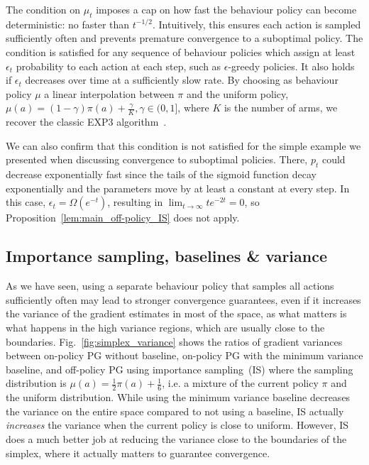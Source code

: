 The condition on $\mu_t$ imposes a cap on how fast the behaviour policy can become deterministic: no faster than $t^{-1/2}$. Intuitively, this ensures each action is sampled sufficiently often and prevents premature convergence to a suboptimal policy.
The condition is satisfied for any sequence of behaviour policies which assign at least $\epsilon_t$ probability to each action at each step, such as $\epsilon$-greedy policies. It also holds if $\epsilon_t$ decreases over time at a sufficiently slow rate. By choosing as behaviour policy $\mu$ a linear interpolation between $\pi$ and the uniform policy, $\mu(a) = (1-\gamma) \pi(a) + \frac{\gamma}{K}, \gamma \in (0,1]$, where $K$ is the number of arms, we recover the classic EXP3 algorithm~\citep{auer2002nonstochastic, seldin2012evaluation}.

We can also confirm that this condition is not satisfied for the simple example we presented when discussing convergence to suboptimal policies. There, $p_t$ could decrease exponentially fast since the tails of the sigmoid function decay exponentially and the parameters move by at least a constant at every step. In this case, $\epsilon_t = \Omega (e^{-t})$, resulting in $\lim_{t\to \infty} t e^{-2 t} = 0$, so Proposition~\ref{lem:main_off-policy_IS} does not apply.

\subsection{Importance sampling, baselines \& variance}
As we have seen, using a separate behaviour policy that samples all actions sufficiently often may lead to stronger convergence guarantees, even if it increases the variance of the gradient estimates in most of the space, as what matters is what happens in the high variance regions, which are usually close to the boundaries. Fig.~\ref{fig:simplex_variance} shows the ratios of gradient variances between on-policy PG without baseline, on-policy PG with the minimum variance baseline, and off-policy PG using importance sampling~(IS) where the sampling distribution is $\mu(a) = \frac{1}{2} \pi(a) + \frac{1}{6}$, i.e. a mixture of the current policy $\pi$ and the uniform distribution. While using the minimum variance baseline decreases the variance on the entire space compared to not using a baseline, IS actually \emph{increases} the variance when the current policy is close to uniform. However, IS does a much better job at reducing the variance close to the boundaries of the simplex, where it actually matters to guarantee convergence.

